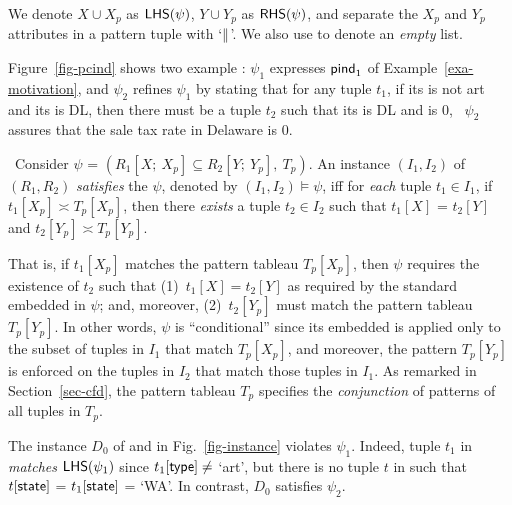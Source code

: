  We denote $X \cup X_p$ as ${\mathsf{LHS}}(\psi)$, $Y \cup Y_p$ as ${\mathsf{RHS}}(\psi)$, and
separate the $X_p$ and $Y_p$ attributes in a pattern tuple with
`$\parallel$'. We also use  to denote an {\em empty} list. 



\vspace{-0.5ex}
\begin{example}
\label{exam-pcind} Figure~\ref{fig-pcind} shows two example \pCINDs:
$\psi_1$ expresses ${\mathsf{pind}}_1$ of Example~\ref{exa-motivation},
and $\psi_2$ refines $\psi_1$ by stating that for any 
tuple $t_1$, if its  is not art and its  is DL,
then there must be a  tuple $t_2$ such that its 
is DL and  is $0$, \ie~$\psi_2$ assures that the sale tax
rate in Delaware is 0.  
\end{example}
\vspace{-1ex}






~Consider \pCIND $\psi$ =
$(R_1[X;\ X_p] \subseteq R_2[Y;\ Y_p],\ T_p)$.
An instance  $(I_1, I_2)$ of $(R_1, R_2)$ {\em satisfies} the \pCIND
$\psi$, denoted by $(I_1, I_2) \models \psi$, iff for {\em each}
tuple $t_1\in I_1$, if $t_1[X_p] \asymp T_p[X_p]$, then there {\em
exists} a tuple $t_2\in I_2$ such that $t_1[X]$ = $t_2[Y]$ and $t_2[Y_p] \asymp T_p[Y_p]$.


That is, if $t_1[X_p]$ matches
the pattern tableau $T_p[X_p]$, then $\psi$ requires the
existence of $t_2$ such that (1)~$t_1[X] = t_2[Y]$ as
required by the standard \IND embedded in $\psi$;
and, moreover, (2)~$t_2[Y_p]$
must match the pattern tableau $T_p[Y_p]$. In other words,
$\psi$ is ``conditional'' since its embedded \IND is applied only to the
subset of tuples in $I_1$ that match $T_p[X_p]$, and moreover,
the pattern $T_p[Y_p]$ is enforced on the tuples in $I_2$
that match those tuples in $I_1$. As remarked in Section~\ref{sec-cfd},
the pattern tableau $T_p$ specifies the {\em conjunction} of
patterns of all tuples in $T_p$.

\vspace{-0.5ex}
\begin{example}
The instance $D_0$ of  and  in
Fig.~\ref{fig-instance} violates \pCIND $\psi_1$. Indeed, tuple
$t_1$ in  {\em matches} ${\mathsf{LHS}}(\psi_1)$ since
$t_1[\protect\mathsf{type}] \ne $ `art', but there is no tuple $t$ in 
such that $t[\protect\mathsf{state}]$ = $t_1[\protect\mathsf{state}]$ = `WA'. In contrast,
$D_0$ satisfies $\psi_2$.
\end{example}


